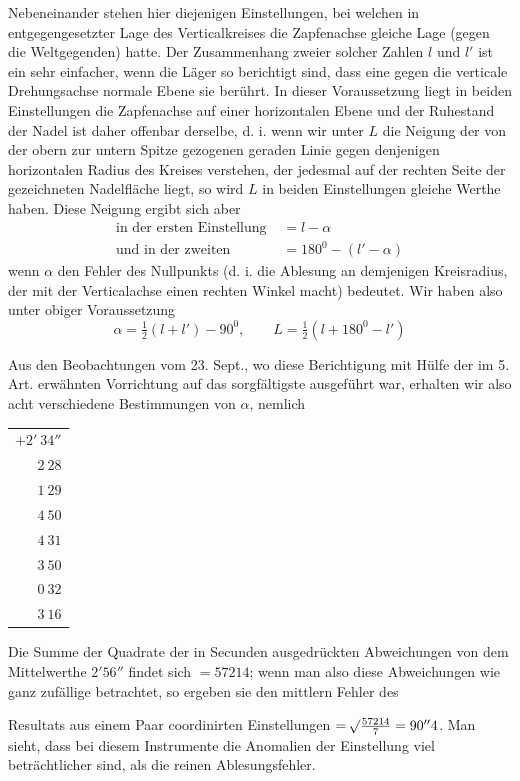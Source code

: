 \par\clearpage
{}Nebeneinander stehen hier diejenigen Einstellungen, bei welchen in entgegengesetzter Lage des Verticalkreises die Zapfenachse gleiche Lage (gegen die Weltgegenden) hatte. Der Zusammenhang zweier solcher Zahlen $l$ und $l'$ ist ein sehr einfacher, wenn die Läger so berichtigt sind, dass eine gegen die verticale Drehungsachse normale Ebene sie berührt. In dieser Voraussetzung liegt in beiden Einstellungen die Zapfenachse auf einer horizontalen Ebene und der Ruhestand der Nadel ist daher offenbar derselbe, d. i. wenn wir unter $L$ die Neigung der von der obern zur untern Spitze gezogenen geraden Linie gegen denjenigen horizontalen Radius des Kreises verstehen, der jedesmal auf der rechten Seite der gezeichneten Nadelfläche liegt, so wird $L$ in beiden Einstellungen gleiche Werthe haben. Diese Neigung ergibt sich aber
\[
\begin{aligned}
\text{in der ersten Einstellung }&=l-\alpha\\
\text{und in der zweiten }&=180^0-(l'-\alpha)
\end{aligned}
\]
wenn $\alpha$ den Fehler des Nullpunkts (d. i. die Ablesung an demjenigen Kreisradius, der mit der Verticalachse einen rechten Winkel macht) bedeutet. Wir haben also unter obiger Voraussetzung
\[
\alpha=\tfrac{1}{2}(l+l')-90^0,\qquad L=\tfrac{1}{2}(l+180^0-l')
\]

Aus den Beobachtungen vom 23. Sept., wo diese Berichtigung mit Hülfe der im 5. Art. erwähnten Vorrichtung auf das sorgfältigste ausgeführt war, erhalten wir also acht verschiedene Bestimmungen von $\alpha$, nemlich
\begin{center}
\begin{tabular}{r}
$+2'\ 34''$\\
$2\ 28$\\
$1\ 29$\\
$4\ 50$\\
$4\ 31$\\
$3\ 50$\\
$0\ 32$\\
$3\ 16$
\end{tabular}
\end{center}

Die Summe der Quadrate der in Secunden ausgedrückten Abweichungen von dem Mittelwerthe $2'56''$ findet sich $=57214$; wenn man also diese Abweichungen wie ganz zufällige betrachtet, so ergeben sie den mittlern Fehler des
\par\clearpage
{}
\noindent Resultats aus einem Paar coordinirten Einstellungen $=\mathord{{}^{}\!\surd}\frac{57214}{7}=90''4$. Man sieht, dass bei diesem Instrumente die Anomalien der Einstellung viel beträchtlicher sind, als die reinen Ablesungsfehler.


